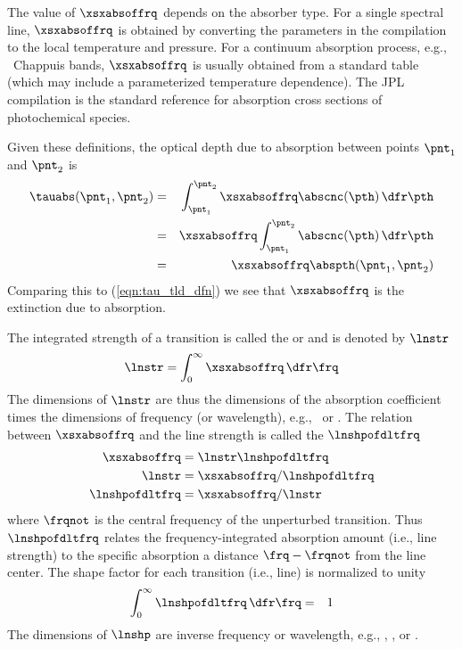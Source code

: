 \documentclass[12pt]{article}
\begin{document}
The value of $\xsxabsoffrq$ depends on the absorber type.
For a single spectral line, $\xsxabsoffrq$ is obtained by converting
the parameters in the  compilation \cite[]{RRG98} to
the local temperature and pressure. 
For a continuum absorption process, e.g., \Ot\ Chappuis bands,
$\xsxabsoffrq$ is usually obtained from a standard table (which may
include a parameterized temperature dependence).
The JPL compilation \cite[]{JPL94} is the standard reference for
absorption cross sections of photochemical species.

Given these definitions, the optical depth due to absorption
between points $\pnt_{1}$ and $\pnt_{2}$ is 
\begin{eqnarray}
\tauabs(\pnt_{1},\pnt_{2}) & = & \int_{\pnt_{1}}^{\pnt_{2}} \xsxabsoffrq
\abscnc(\pth) \,\dfr\pth 
\nonumber \\
& = & \xsxabsoffrq \int_{\pnt_{1}}^{\pnt_{2}} \abscnc(\pth) \,\dfr\pth \nonumber \\
& = & \xsxabsoffrq \abspth(\pnt_{1},\pnt_{2})
\label{eqn:tau_abs_dfn}
\end{eqnarray}
Comparing this to (\ref{eqn:tau_tld_dfn}) we see that $\xsxabsoffrq$ is the
extinction due to absorption.

The integrated strength of a transition is called the  or  and is denoted by $\lnstr$ 
\begin{equation}
\lnstr = \int_{0}^{\infty} \xsxabsoffrq \,\dfr\frq
\label{eqn:lnstr_dfn}
\end{equation}
The dimensions of $\lnstr$ are thus the dimensions of the absorption
coefficient times the dimensions of frequency (or wavelength), e.g.,
\mSxkgxhz\ or \mSxkgxm.
The relation between $\xsxabsoffrq$ and the line strength is called the
 $\lnshpofdltfrq$
\begin{subequations}
\label{eqn:lnshp_dfn}
\begin{align}
\label{eqn:xsx_lnstr_lnshp}
\xsxabsoffrq & = \lnstr \lnshpofdltfrq \\
\label{eqn:lnstr_xsx_lnshp}
\lnstr & = \xsxabsoffrq / \lnshpofdltfrq \\
\label{eqn:lnshp_xsx_lnstr}
\lnshpofdltfrq & = \xsxabsoffrq / \lnstr
\end{align}
\end{subequations} 
where $\frqnot$ is the central frequency of the unperturbed
transition. 
Thus $\lnshpofdltfrq$ relates the frequency-integrated absorption amount
(i.e., line strength) to the specific absorption a distance $\frq -
\frqnot$ from the line center.
The shape factor for each transition (i.e., line) is normalized to
unity
\begin{eqnarray}
\int_{0}^{\infty} \lnshpofdltfrq \,\dfr\frq & = & 1
\label{eqn:lnshp_nrm}
\end{eqnarray}
The dimensions of $\lnshp$ are inverse frequency or wavelength, e.g.,
\xfrq, \xhz, or \xm.
\end{document}

